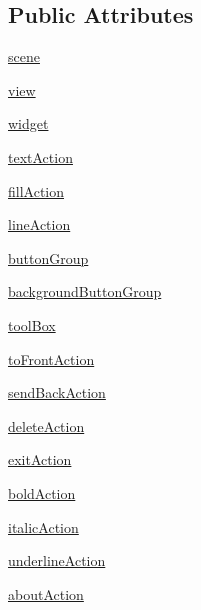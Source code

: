 \subsection*{Public Attributes}
\begin{DoxyCompactItemize}
\item 
\hyperlink{classdiagramscene_1_1MainWindow_a266990d70c942640e59749a5353ed3a1}{scene}
\item 
\hyperlink{classdiagramscene_1_1MainWindow_aa643fc8818f80297a7d3f841d031bbea}{view}
\item 
\hyperlink{classdiagramscene_1_1MainWindow_a3919750fb45b6d5dd507a301cd296135}{widget}
\item 
\hyperlink{classdiagramscene_1_1MainWindow_a1e6da3dbd5d2d671e337dbc5e2ffc6c4}{text\+Action}
\item 
\hyperlink{classdiagramscene_1_1MainWindow_a058f5b7abd055699e58f7636f6d0b938}{fill\+Action}
\item 
\hyperlink{classdiagramscene_1_1MainWindow_a0c3fc0c1de8466c3f7085347491c7651}{line\+Action}
\item 
\hyperlink{classdiagramscene_1_1MainWindow_a99b91334758fb8c00c5f5857c8dfb6d0}{button\+Group}
\item 
\hyperlink{classdiagramscene_1_1MainWindow_a8e06fab88548419591133ee8fab9b5b9}{background\+Button\+Group}
\item 
\hyperlink{classdiagramscene_1_1MainWindow_a52d4baf960d445cb354d668a0bab28e7}{tool\+Box}
\item 
\hyperlink{classdiagramscene_1_1MainWindow_a72f3249c465cd92bc5a57cbf5c938725}{to\+Front\+Action}
\item 
\hyperlink{classdiagramscene_1_1MainWindow_a6041843fa0ebf22f63143deb7c003211}{send\+Back\+Action}
\item 
\hyperlink{classdiagramscene_1_1MainWindow_a731c112e2aaf5d164e4dc97193d13511}{delete\+Action}
\item 
\hyperlink{classdiagramscene_1_1MainWindow_aaba645e4a23599bbea0fac681de4c5e7}{exit\+Action}
\item 
\hyperlink{classdiagramscene_1_1MainWindow_ab7ed86eea405b7869847ebb69ec1c761}{bold\+Action}
\item 
\hyperlink{classdiagramscene_1_1MainWindow_a52706e5547b1616db3f23ebaedd23dff}{italic\+Action}
\item 
\hyperlink{classdiagramscene_1_1MainWindow_a855fa2dc987de597c51478c1f4aa7785}{underline\+Action}
\item 
\hyperlink{classdiagramscene_1_1MainWindow_a3df7f8d8bf90ce79904b2ae442a4e72a}{about\+Action}

\end{DoxyCompactItemize}
